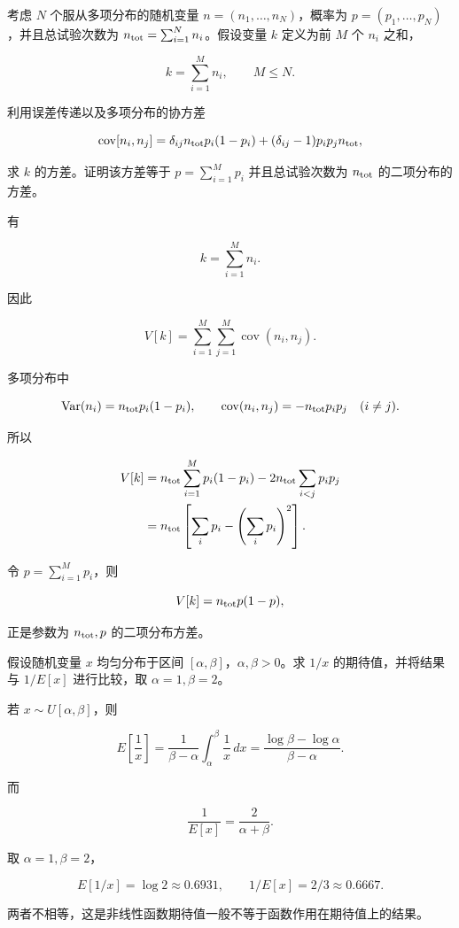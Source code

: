 ﻿





\begin{question}
考虑 \(N\) 个服从多项分布的随机变量 \(n=(n_1,\ldots,n_N)\)，概率为
\(p=(p_1,\ldots,p_N)\)，并且总试验次数为
\(n_{\rm tot}=\sum_{i=1}^{N}n_i\)。假设变量 \(k\) 定义为前 \(M\) 个
\(n_i\) 之和，

\[
k=\sum_{i=1}^{M}n_i,\qquad M\le N.
\]

利用误差传递以及多项分布的协方差

\[
\operatorname{cov}[n_i,n_j]=\delta_{ij}n_{\rm tot}p_i(1-p_i)+(\delta_{ij}-1)p_ip_jn_{\rm tot},
\]

求 \(k\) 的方差。证明该方差等于 \(p=\sum_{i=1}^{M}p_i\) 并且总试验次数为
\(n_{\rm tot}\) 的二项分布的方差。
\begin{solution}
有

\[
k=\sum_{i=1}^M n_i.
\]

因此

\[
V[k]=\sum_{i=1}^M\sum_{j=1}^M\operatorname{cov}(n_i,n_j).
\]

多项分布中

\[
\operatorname{Var}(n_i)=n_{\rm tot}p_i(1-p_i),\qquad
\operatorname{cov}(n_i,n_j)=-n_{\rm tot}p_ip_j\quad(i\ne j).
\]

所以

\[
\begin{split}
V[k]
&=n_{\rm tot}\sum_{i=1}^M p_i(1-p_i)-2n_{\rm tot}\sum_{i<j}p_ip_j\\
&=n_{\rm tot}\left[\sum_i p_i-\left(\sum_i p_i\right)^2\right].
\end{split}
\]

令 \(p=\sum_{i=1}^M p_i\)，则

\[
V[k]=n_{\rm tot}p(1-p),
\]

正是参数为 \(n_{\rm tot},p\) 的二项分布方差。
\end{solution}
\end{question}



\begin{question}
假设随机变量 \(x\) 均匀分布于区间
\([\alpha,\beta]\)，\(\alpha,\beta>0\)。求 \(1/x\) 的期待值，并将结果与
\(1/E[x]\) 进行比较，取 \(\alpha=1,\beta=2\)。
\begin{solution}
若 \(x\sim U[\alpha,\beta]\)，则

\[
E\left[\frac1x\right]=\frac{1}{\beta-\alpha}\int_\alpha^\beta\frac1x\,dx
=\frac{\log\beta-\log\alpha}{\beta-\alpha}.
\]

而

\[
\frac1{E[x]}=\frac{2}{\alpha+\beta}.
\]

取 \(\alpha=1,\beta=2\)，

\[
E[1/x]=\log2\approx0.6931,
\qquad
1/E[x]=2/3\approx0.6667.
\]

两者不相等，这是非线性函数期待值一般不等于函数作用在期待值上的结果。
\end{solution}
\end{question}



